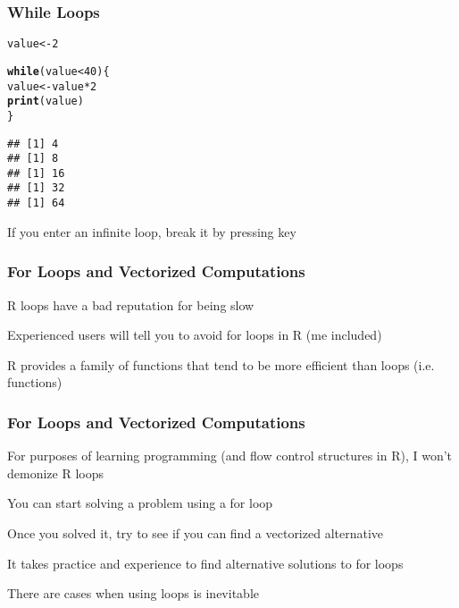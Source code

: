 \documentclass[12pt]{beamer}\usepackage[]{graphicx}\usepackage[]{color}
\makeatletter
\newcommand{\hlnum}[1]{\textcolor[rgb]{0.686,0.059,0.569}{#1}}%
\newcommand{\hlopt}[1]{\textcolor[rgb]{0,0,0}{#1}}%
\newcommand{\hlstd}[1]{\textcolor[rgb]{0.345,0.345,0.345}{#1}}%
\newcommand{\hlkwa}[1]{\textcolor[rgb]{0.161,0.373,0.58}{\textbf{#1}}}%
\newcommand{\hlkwb}[1]{\textcolor[rgb]{0.69,0.353,0.396}{#1}}%
\newcommand{\hlkwd}[1]{\textcolor[rgb]{0.737,0.353,0.396}{\textbf{#1}}}%
\newenvironment{kframe}{%
 \def\at@end@of@kframe{}%
 \ifinner\ifhmode%
  \def\at@end@of@kframe{\end{minipage}}%
  \begin{minipage}{\columnwidth}%
 \fi\fi%
 \def\FrameCommand##1{\hskip\@totalleftmargin \hskip-\fboxsep
 \colorbox{shadecolor}{##1}\hskip-\fboxsep
     \hskip-\linewidth \hskip-\@totalleftmargin \hskip\columnwidth}%
 \MakeFramed {\advance\hsize-\width
   \@totalleftmargin\z@ \linewidth\hsize
   \@setminipage}}%
 {\par\unskip\endMakeFramed%
 \at@end@of@kframe}
\newenvironment{knitrout}{}{} %
\makeatother
\begin{document}
\begin{frame}[fragile]
\frametitle{While Loops}

\begin{knitrout}\footnotesize
{}\color{fgcolor}\begin{kframe}
\begin{alltt}
\hlstd{value} \hlkwb{<-} \hlnum{2}

\hlkwa{while} \hlstd{(value} \hlopt{<} \hlnum{40}\hlstd{) \{}
  \hlstd{value} \hlkwb{<-} \hlstd{value} \hlopt{*} \hlnum{2}
  \hlkwd{print}\hlstd{(value)}
\hlstd{\}}
\end{alltt}
\begin{verbatim}
## [1] 4
## [1] 8
## [1] 16
## [1] 32
## [1] 64
\end{verbatim}
\end{kframe}
\end{knitrout}

If you enter an infinite loop, break it by pressing  key

\end{frame}


\begin{frame}
\frametitle{For Loops and Vectorized Computations}

\bi
  \item R  loops have a bad reputation for being slow
  \item Experienced users will tell you to avoid for loops in R (me included)
  \item R provides a family of functions that tend to be more efficient than loops (i.e.  functions)
\ei

\end{frame}


\begin{frame}
\frametitle{For Loops and Vectorized Computations}

\bi
  \item For purposes of learning programming (and flow control structures in R), I won't demonize R loops
  \item You can start solving a problem using a for loop
  \item Once you solved it, try to see if you can find a vectorized alternative
  \item It takes practice and experience to find alternative solutions to for loops
  \item There are cases when using  loops is inevitable
\ei

\end{frame}
\end{document}
